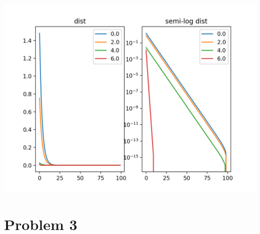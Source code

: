 \documentclass{article}
\begin{document}
\begin{center}
  \includegraphics[scale=0.7]{lasso.png}
\end{center}


\section*{Problem 3}
\end{document}
